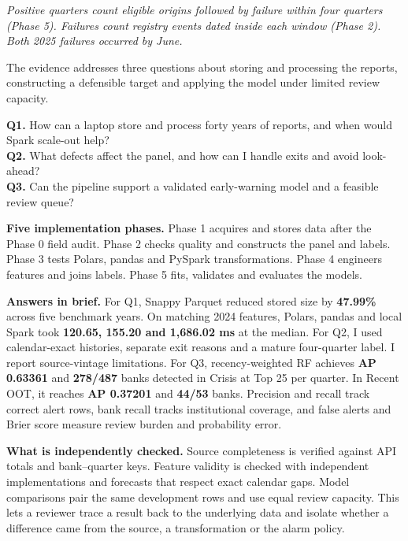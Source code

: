 \documentclass[
  12pt,
  a4paper,
]{article}
\renewcommand{\arraystretch}{1.16}
\newcommand{\notetext}[1]{\par{\fontsize{10.3bp}{13bp}\selectfont\itshape\color{sublabel}#1\par}}
\begin{document}
\notetext{Positive quarters count eligible origins followed by failure within four quarters (Phase 5). Failures count registry events dated inside each window (Phase 2). Both 2025 failures occurred by June.}

The evidence addresses three questions about storing and processing the
reports, constructing a defensible target and applying the model under
limited review capacity.

\textbf{Q1.} How can a laptop store and process forty years of reports,
and when would Spark scale-out help?\\
\textbf{Q2.} What defects affect the panel, and how can I handle exits
and avoid look-ahead?\\
\textbf{Q3.} Can the pipeline support a validated early-warning model
and a feasible review queue?

\textbf{Five implementation phases.} Phase 1 acquires and stores data
after the Phase 0 field audit. Phase 2 checks quality and constructs the
panel and labels. Phase 3 tests Polars, pandas and PySpark
transformations. Phase 4 engineers features and joins labels. Phase 5
fits, validates and evaluates the models.

\textbf{Answers in brief.} For Q1, Snappy Parquet reduced stored size by
\textbf{47.99\%} across five benchmark years. On matching 2024 features,
Polars, pandas and local Spark took \textbf{120.65, 155.20 and 1,686.02
ms} at the median. For Q2, I used calendar-exact histories, separate
exit reasons and a mature four-quarter label. I report source-vintage
limitations. For Q3, recency-weighted RF achieves \textbf{AP 0.63361}
and \textbf{278/487} banks detected in Crisis at Top 25 per quarter. In
Recent OOT, it reaches \textbf{AP 0.37201} and \textbf{44/53} banks.
Precision and recall track correct alert rows, bank recall tracks
institutional coverage, and false alerts and Brier score measure review
burden and probability error.

\textbf{What is independently checked.} Source completeness is verified
against API totals and bank--quarter keys. Feature validity is checked
with independent implementations and forecasts that respect exact
calendar gaps. Model comparisons pair the same development rows and use
equal review capacity. This lets a reviewer trace a result back to the
underlying data and isolate whether a difference came from the source, a
transformation or the alarm policy.

\newpage
\setlength{\parskip}{2.9pt plus .55pt minus .3pt}
\renewcommand{\arraystretch}{1.10}
\fontsize{11bp}{12.45bp}\selectfont
\end{document}
